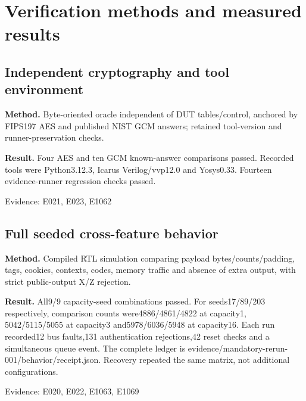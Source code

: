 \documentclass[11pt,a4paper]{article}
\begin{document}
\section{Verification methods and measured results}

\subsection{Independent cryptography and tool environment}

\textbf{Method.} Byte-oriented oracle independent of DUT tables/\allowbreak{}control,\allowbreak{} anchored by FIPS197 AES and published NIST GCM answers; retained tool-version and runner-preservation checks.

\textbf{Result.} Four AES and ten GCM known-answer comparisons passed. Recorded tools were Python3.12.3,\allowbreak{} Icarus Verilog/\allowbreak{}vvp12.0 and Yosys0.33. Fourteen evidence-runner regression checks passed.

{\small Evidence: E021,\allowbreak{} E023,\allowbreak{} E1062}

\subsection{Full seeded cross-feature behavior}

\textbf{Method.} Compiled RTL simulation comparing payload bytes/\allowbreak{}counts/\allowbreak{}padding,\allowbreak{} tags,\allowbreak{} cookies,\allowbreak{} contexts,\allowbreak{} codes,\allowbreak{} memory traffic and absence of extra output,\allowbreak{} with strict public-output X/\allowbreak{}Z rejection.

\textbf{Result.} All9/\allowbreak{}9 capacity-seed combinations passed. For seeds17/\allowbreak{}89/\allowbreak{}203 respectively,\allowbreak{} comparison counts were4886/\allowbreak{}4861/\allowbreak{}4822 at capacity1,\allowbreak{} 5042/\allowbreak{}5115/\allowbreak{}5055 at capacity3 and5978/\allowbreak{}6036/\allowbreak{}5948 at capacity16. Each run recorded12 bus faults,\allowbreak{}131 authentication rejections,\allowbreak{}42 reset checks and a simultaneous queue event. The complete ledger is evidence/\allowbreak{}mandatory-rerun-001/\allowbreak{}behavior/\allowbreak{}receipt.json. Recovery repeated the same matrix,\allowbreak{} not additional configurations.

{\small Evidence: E020,\allowbreak{} E022,\allowbreak{} E1063,\allowbreak{} E1069}
\end{document}
